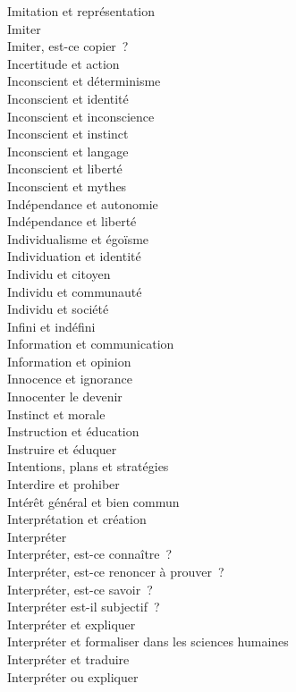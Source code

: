 \documentclass[a4paper,12pt]{article}
\begin{document}
Imitation et représentation \\
Imiter \\
Imiter, est-ce copier ? \\
Incertitude et action \\
Inconscient et déterminisme \\
Inconscient et identité \\
Inconscient et inconscience \\
Inconscient et instinct \\
Inconscient et langage \\
Inconscient et liberté \\
Inconscient et mythes \\
Indépendance et autonomie \\
Indépendance et liberté \\
Individualisme et égoïsme \\
Individuation et identité \\
Individu et citoyen \\
Individu et communauté \\
Individu et société \\
Infini et indéfini \\
Information et communication \\
Information et opinion \\
Innocence et ignorance \\
Innocenter le devenir \\
Instinct et morale \\
Instruction et éducation \\
Instruire et éduquer \\
Intentions, plans et stratégies \\
Interdire et prohiber \\
Intérêt général et bien commun \\
Interprétation et création \\
Interpréter \\
Interpréter, est-ce connaître ? \\
Interpréter, est-ce renoncer à prouver ? \\
Interpréter, est-ce savoir ? \\
Interpréter est-il subjectif ? \\
Interpréter et expliquer \\
Interpréter et formaliser dans les sciences humaines \\
Interpréter et traduire \\
Interpréter ou expliquer \\
\end{document}
